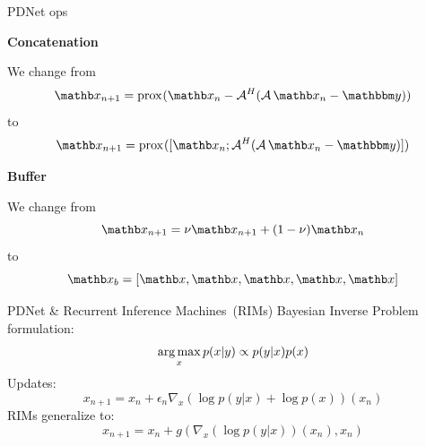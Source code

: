 \begin{frame}{PDNet ops}
    \begin{multicols}{2}
        \begin{center}
            \textbf{Concatenation}\\
        \end{center}
            We change from
            \begin{equation*}
                \xb_{n+1} = \prox{} (\xb_n - {\cal A}^H({\cal A}\, \xb_n - \ybb) )
            \end{equation*}
            to
            \begin{equation*}
                \xb_{n+1} = \prox{} ([\xb_n; {\cal A}^H({\cal A}\, \xb_n - \ybb)])
            \end{equation*}

        \newpage
        \begin{center}
            \textbf{Buffer}\\
        \end{center}
            We change from
            \begin{equation*}
                \xb_{n+1} = \nu \xb_{n+1} + (1-\nu) \xb_n
            \end{equation*}
            to
            \begin{equation*}
                \xb_b = [\xb, \xb, \xb, \xb, \xb]
            \end{equation*}

    \end{multicols}

\end{frame}

\begin{frame}{PDNet \& Recurrent Inference Machines~(RIMs)}
    Bayesian Inverse Problem formulation:
    \begin{equation*}
        \mathop{\mathrm{arg\,max}}_x p(x|y) \propto p(y|x) p(x)
    \end{equation*}
    Updates:
    \begin{equation*}
        x_{n+1} = x_n + \epsilon_n \nabla_x (\log p(y|x) + \log p(x))(x_n)
    \end{equation*}
    RIMs generalize to:
    \begin{equation*}
        x_{n+1} = x_n + g(\nabla_x(\log p(y|x))(x_n), x_n)
    \end{equation*}
\end{frame}

